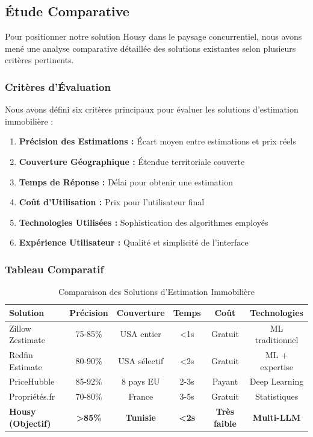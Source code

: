 \subsection{Étude Comparative}

Pour positionner notre solution Housy dans le paysage concurrentiel, nous avons mené une analyse comparative détaillée des solutions existantes selon plusieurs critères pertinents.

\subsubsection{Critères d'Évaluation}

Nous avons défini six critères principaux pour évaluer les solutions d'estimation immobilière :

\begin{enumerate}
    \item \textbf{Précision des Estimations :} Écart moyen entre estimations et prix réels
    \item \textbf{Couverture Géographique :} Étendue territoriale couverte
    \item \textbf{Temps de Réponse :} Délai pour obtenir une estimation
    \item \textbf{Coût d'Utilisation :} Prix pour l'utilisateur final
    \item \textbf{Technologies Utilisées :} Sophistication des algorithmes employés
    \item \textbf{Expérience Utilisateur :} Qualité et simplicité de l'interface
\end{enumerate}

\subsubsection{Tableau Comparatif}

\begin{table}[H]
\centering
\caption{Comparaison des Solutions d'Estimation Immobilière}
\begin{tabular}{|l|c|c|c|c|c|}
\hline
\textbf{Solution} & \textbf{Précision} & \textbf{Couverture} & \textbf{Temps} & \textbf{Coût} & \textbf{Technologies} \\
\hline
Zillow Zestimate & 75-85\% & USA entier & <1s & Gratuit & ML traditionnel \\
\hline
Redfin Estimate & 80-90\% & USA sélectif & <2s & Gratuit & ML + expertise \\
\hline
PriceHubble & 85-92\% & 8 pays EU & 2-3s & Payant & Deep Learning \\
\hline
Propriétés.fr & 70-80\% & France & 3-5s & Gratuit & Statistiques \\
\hline
\textbf{Housy (Objectif)} & \textbf{>85\%} & \textbf{Tunisie} & \textbf{<2s} & \textbf{Très faible} & \textbf{Multi-LLM} \\
\hline
\end{tabular}
\end{table}


